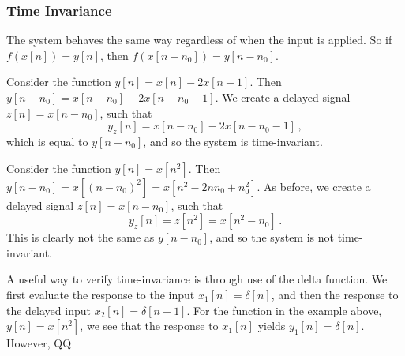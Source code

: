 \subsubsection{Time Invariance}
%
The system behaves the same way regardless of when the input is applied. So if
$f(x[n]) = y[n]$, then $f(x[n-n_0]) = y[n-n_0]$.
%
\begin{exmp}
  Consider the function $y[n] = x[n] - 2x[n-1]$. Then $y[n-n_0] = x[n-n_0] - 2x[n-n_0-1]$.
  We create a delayed signal $z[n] = x[n-n_0]$, such that
  \begin{displaymath}
    y_z[n] = x[n-n_0] - 2x[n-n_0-1] \,,
  \end{displaymath}
  which is equal to $y[n-n_0]$, and so the system is time-invariant.
\end{exmp}
%
\begin{exmp}
  Consider the function $y[n] = x[n^2]$. Then
  $y[n-n_0] = x[(n-n_0)^2] = x[n^2-2nn_0 + n_0^2]$. As before, we create a delayed signal
  $z[n] = x[n-n_0]$, such that
  \begin{displaymath}
    y_z[n] = z[n^2] = x[n^2 - n_0] \,.
  \end{displaymath}
  This is clearly not the same as $y[n-n_0]$, and so the system is not time-invariant.
\end{exmp}
%
A useful way to verify time-invariance is through use of the delta function. We first evaluate
the response to the input $x_1[n] = \delta[n]$, and then the response to the delayed input
$x_2[n] = \delta[n-1]$. For the function in the example above, $y[n] = x[n^2]$, we see that
the response to $x_1[n]$ yields $y_1[n] = \delta[n]$. However, QQ

